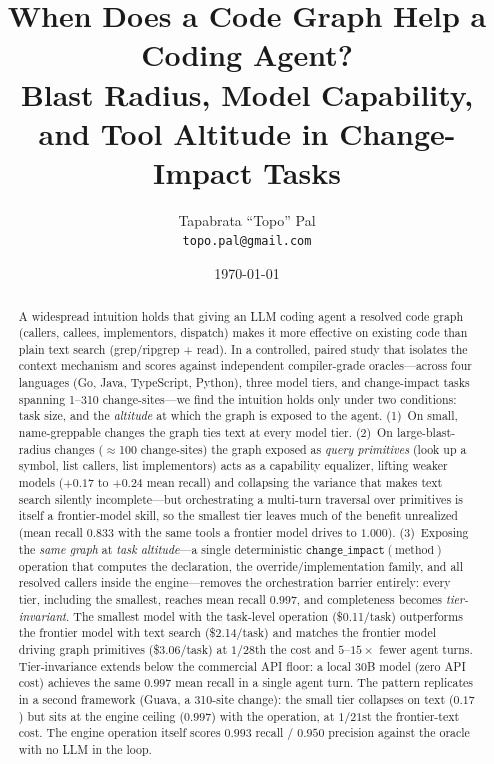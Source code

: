 \documentclass[11pt]{article}
\title{\textbf{When Does a Code Graph Help a Coding Agent?}\\
\large Blast Radius, Model Capability, and Tool Altitude in Change-Impact Tasks}
\author{
  Tapabrata ``Topo'' Pal\\
  \texttt{topo.pal@gmail.com}
}
\date{\today}
\newcommand{\code}[1]{\texttt{#1}}
\begin{document}
\maketitle

\begin{abstract}
A widespread intuition holds that giving an LLM coding agent a resolved code
graph (callers, callees, implementors, dispatch) makes it more effective on
existing code than plain text search (grep/ripgrep + read). In a controlled,
paired study that isolates the context mechanism and scores against independent
compiler-grade oracles---across four languages (Go, Java, TypeScript, Python),
three model tiers, and change-impact tasks spanning 1--310 change-sites---we
find the intuition holds only under two conditions: task size, and the \emph{altitude} at which
the graph is exposed to the agent. (1)~On small, name-greppable changes the graph
ties text at every model tier. (2)~On large-blast-radius changes
($\approx$100 change-sites) the graph exposed as \emph{query primitives}
(look up a symbol, list callers, list implementors) acts as a capability
equalizer, lifting weaker models ($+0.17$ to $+0.24$ mean recall) and collapsing
the variance that makes text search silently incomplete---but orchestrating a
multi-turn traversal over primitives is itself a frontier-model skill, so the
smallest tier leaves much of the benefit unrealized (mean recall $0.833$ with the
same tools a frontier model drives to $1.000$). (3)~Exposing the \emph{same
graph} at \emph{task altitude}---a single deterministic
$\code{change\_impact}(\text{method})$ operation that computes the declaration,
the override/implementation family, and all resolved callers inside the
engine---removes the orchestration barrier entirely: every tier, including the
smallest, reaches mean recall $0.997$, and completeness becomes
\emph{tier-invariant}. The smallest model with the task-level operation
(\$0.11/task) outperforms the frontier model with text search (\$2.14/task) and
matches the frontier model driving graph primitives (\$3.06/task) at $1/28$th the
cost and $5$--$15\times$ fewer agent turns. Tier-invariance extends below the
commercial API floor: a local 30B model (zero API cost) achieves the same
$0.997$ mean recall in a single agent turn. The pattern replicates in a second
framework (Guava, a 310-site change): the small tier collapses on text
($0.17$) but sits at the engine ceiling ($0.997$) with the operation, at
$1/21$st the frontier-text cost. The engine operation itself scores
$0.993$ recall / $0.950$ precision against the oracle with no LLM in the loop.

\end{abstract}
\end{document}
